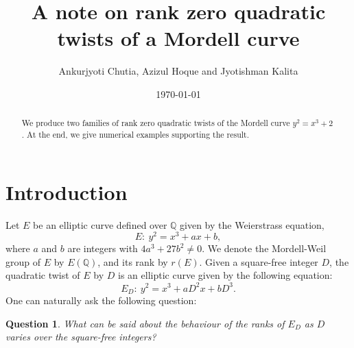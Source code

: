 \documentclass[12pt, 14paper,reqno]{amsart}
\theoremstyle{plain}
\newtheorem{q}{Question}[section]
\theoremstyle{proof}
\numberwithin{equation}{section}
\begin{document}
 
\title[Rank zero quadratic twists of a Mordell curve]{A note on rank zero quadratic twists of a Mordell curve}
\author{Ankurjyoti Chutia, Azizul Hoque and Jyotishman Kalita}
\address{A. Chutia @Department of Mathematics, Gauhati University, Guwahati-781014, Assam, India}
\address{A. Hoque @Department of Mathematics, Faculty of Science, Rangapara College, Rangapara-784505, Assam, India}
\address{J. Kalita @Department of Mathematics, Gauhati University, Guwahati-781014, Assam, India}
\date{\today}
\maketitle

\begin{abstract}
We produce two families of rank zero quadratic twists of the Mordell curve $y^2=x^3+2$. %
At the end, we give numerical examples supporting the result.
\end{abstract}

\section{Introduction}
Let $E$ be an elliptic curve defined over $\mathbb{Q}$ given by the Weierstrass equation,
$$E:~y^2=x^3+ax+b,$$
where $a$ and $b$ are integers with $4a^3+27b^2\ne 0$. We denote the Mordell-Weil group of $E$ by $E(\mathbb{Q})$, and its rank by $r(E)$. Given a square-free integer $D$, the quadratic twist of $E$ by $D$ is an elliptic curve given by the following equation: 
$$E_D:~ y^2 = x^3 + aD^2x + bD^3.$$ 
One can naturally ask the following question:
\begin{q}\label{q1}
What can be said about the behaviour of the ranks of $E_D$ as $D$ varies over the square-free integers?
\end{q}
\end{document}
